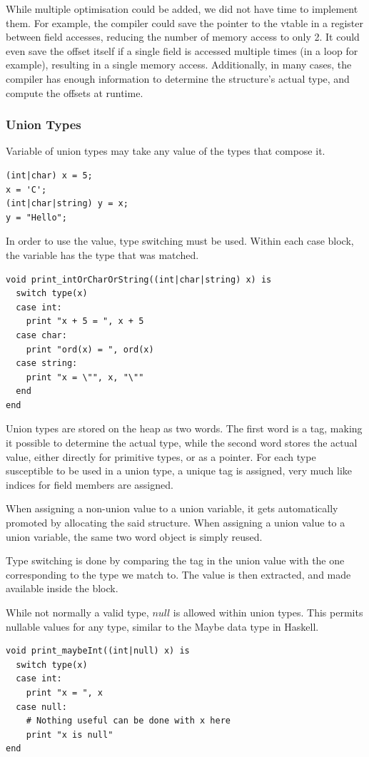 \documentclass{article}
\begin{document}
While multiple optimisation could be added, we did not have time to implement them.
For example, the compiler could save the pointer to the vtable in a register between field accesses, reducing the
number of memory access to only 2. It could even save the offset itself if a single field is accessed multiple
times (in a loop for example), resulting in a single memory access. Additionally, in many cases, the compiler
has enough information to determine the structure's actual type, and compute the offsets at runtime.

\subsubsection{Union Types}
Variable of union types may take any value of the types that compose it.
\begin{lstlisting}
(int|char) x = 5;
x = 'C';
(int|char|string) y = x;
y = "Hello";
\end{lstlisting}

In order to use the value, type switching must be used. Within each case block, the variable has the type that was
matched.
\begin{lstlisting}
void print_intOrCharOrString((int|char|string) x) is
  switch type(x)
  case int:
    print "x + 5 = ", x + 5
  case char:
    print "ord(x) = ", ord(x)
  case string:
    print "x = \"", x, "\""
  end
end
\end{lstlisting}

Union types are stored on the heap as two words. The first word is a tag, making it possible to determine the actual
type, while the second word stores the actual value, either directly for primitive types, or as a pointer.
For each type susceptible to be used in a union type, a unique tag is assigned, very much like indices for field members
are assigned.

When assigning a non-union value to a union variable, it gets automatically promoted by allocating the said structure.
When assigning a union value to a union variable, the same two word object is simply reused.

Type switching is done by comparing the tag in the union value with the one corresponding to the type we match to.
The value is then extracted, and made available inside the block.

While not normally a valid type, $null$ is allowed within union types. This permits nullable values for any type, similar to the Maybe data type in Haskell.
\begin{lstlisting}
void print_maybeInt((int|null) x) is
  switch type(x)
  case int:
    print "x = ", x
  case null:
    # Nothing useful can be done with x here
    print "x is null"
end
\end{lstlisting}
\end{document}
